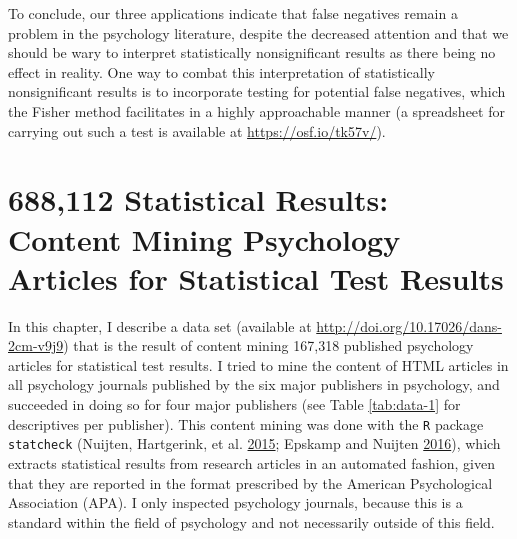\documentclass[a5paper]{book}
\begin{document}
To conclude, our three applications indicate that false negatives remain
a problem in the psychology literature, despite the decreased attention
and that we should be wary to interpret statistically nonsignificant
results as there being no effect in reality. One way to combat this
interpretation of statistically nonsignificant results is to incorporate
testing for potential false negatives, which the Fisher method
facilitates in a highly approachable manner (a spreadsheet for carrying
out such a test is available at \url{https://osf.io/tk57v/}).

\chapter{688,112 Statistical Results: Content Mining Psychology Articles
for Statistical Test
Results}\label{statistical-results-content-mining-psychology-articles-for-statistical-test-results}

In this chapter, I describe a data set (available at
\url{http://doi.org/10.17026/dans-2cm-v9j9}) that is the result of
content mining 167,318 published psychology articles for statistical
test results. I tried to mine the content of HTML articles in all
psychology journals published by the six major publishers in psychology,
and succeeded in doing so for four major publishers (see Table
\ref{tab:data-1} for descriptives per publisher). This content mining
was done with the \texttt{R} package \texttt{statcheck} (Nuijten,
Hartgerink, et al.
\protect\hyperlink{ref-doi:10.3758ux2fs13428-015-0664-2}{2015}; Epskamp
and Nuijten \protect\hyperlink{ref-statcheck}{2016}), which extracts
statistical results from research articles in an automated fashion,
given that they are reported in the format prescribed by the American
Psychological Association (APA). I only inspected psychology journals,
because this is a standard within the field of psychology and not
necessarily outside of this field.
\end{document}

